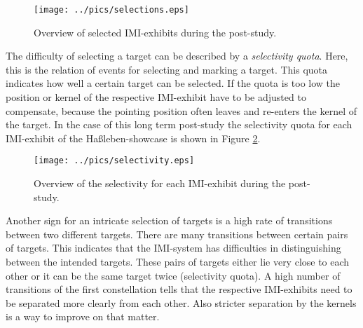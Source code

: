 
\begin{figure}[H]%
\texttt{[image: ../pics/selections.eps]}%
\caption{Overview of selected \ac{IMI}-exhibits during the post-study.}%
\label{fig:post-study_selections} %
\end{figure}

The difficulty of selecting a target can be described by a \textit{selectivity quota}. Here, this is the relation of events for selecting and marking a target. This quota indicates how well a certain target can be selected. If the quota is too low the position or kernel of the respective \ac{IMI}-exhibit have to be adjusted to compensate, because the pointing position often leaves and re-enters the kernel of the target. In the case of this long term post-study the selectivity quota for each \ac{IMI}-exhibit of the Haßleben-showcase is shown in Figure \ref{fig:post-study_selectivity}.
\begin{figure}[H]%
\texttt{[image: ../pics/selectivity.eps]}%
\caption{Overview of the selectivity for each \ac{IMI}-exhibit during the post-study.}
\label{fig:post-study_selectivity} %
\end{figure}

Another sign for an intricate selection of targets is a high rate of transitions between two different targets. There are many transitions between certain pairs of targets. This indicates that the \ac{IMI}-system has difficulties in distinguishing between the intended targets. These pairs of targets either lie very close to each other or it can be the same target twice (selectivity quota). A high number of transitions of the first constellation tells that the respective \ac{IMI}-exhibits need to be separated more clearly from each other. Also stricter separation by the kernels is a way to improve on that matter.

